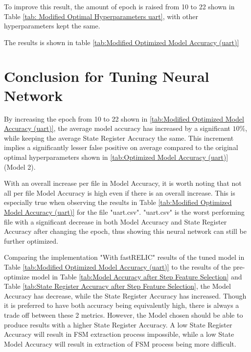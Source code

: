 \documentclass{tum-book}
\begin{document}
        \bigskip\noindent
        To improve this result, the amount of epoch is raised from 10 to 22 shown in Table \ref{tab: Modified Optimal Hyperparameters uart}, with other hyperparameters kept the same. 
        
        \begin{table}[ht]
            \centering
            
        \end{table}
        
        The results is shown in table \ref{tab:Modified Optimized Model Accuracy (uart)}
        
        \begin{table}[ht]
            \centering
            
        \end{table}
        
    \newpage\section{Conclusion for Tuning Neural Network}
    By increasing the epoch from 10 to 22 shown in \ref{tab:Modified Optimized Model Accuracy (uart)}, the average model accuracy has increased by a significant $10\%$, while keeping the average State Register Accuracy the same. This increment implies a significantly lesser false positive on average compared to the original optimal hyperparameters shown in \ref{tab:Optimized Model Accuracy (uart)} (Model 2).
    
    \bigskip\noindent
    With an overall increase per file in Model Accuracy, it is worth noting that not all per file Model Accuracy is high even if there is an overall increase. This is especially true when observing the results in Table \ref{tab:Modified Optimized Model Accuracy (uart)} for the file "uart.csv". "uart.csv" is the worst performing file with a significant decrease in both Model Accuracy and State Register Accuracy after changing the epoch, thus showing this neural network can still be further optimized.
    
    \bigskip\noindent
    Comparing the implementation "With fastRELIC" results of the tuned model in Table \ref{tab:Modified Optimized Model Accuracy (uart)} to the results of the pre-optimize model in Table \ref{tab:Model Accuracy after Step Feature Selection} and Table \ref{tab:State Register Accuracy after Step Feature Selection}, the Model Accuracy has decrease, while the State Register Accuracy has increased. Though it is preferred to have both accuracy being equivalently high, there is always a trade off between these 2 metrics. However, the Model chosen should be able to produce results with a higher State Register Accuracy. A low State Register Accuracy will result in FSM extraction process impossible, while a low State Model Accuracy will result in extraction of FSM process being more difficult.
\end{document}
